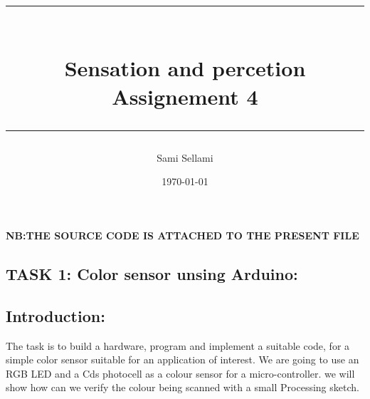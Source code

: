 \documentclass[12pt,a4paper]{report}
\title{
\rule{15cm}{1pt} \\
\Large {\bfseries Sensation and percetion} \\
\Large {\bfseries Assignement 4}\\
\rule{15cm}{1pt}}
\author{Sami Sellami}
\date{\today}
\begin{document}
\setcounter{page}{1}
\setcounter{secnumdepth}{1}
	
\selectfont

\maketitle

\titlelabel{\thetitle)\quad}
\titlespacing{\chapter}{0cm}{0cm}{0cm}
\titlespacing{\section}{0.2cm}{0cm}{0cm}

\textbf{NB:THE SOURCE CODE IS ATTACHED TO THE PRESENT FILE} 


\subsection{TASK 1: Color sensor unsing Arduino:}

\subsection*{Introduction:}
The task is to build a hardware, program and implement a suitable code, for a simple color sensor suitable for an application of interest. 
We are going to use an RGB LED and a Cds photocell as a colour sensor for a micro-controller. we will show  how  can we verify the colour being scanned with a small Processing sketch.
\end{document}
